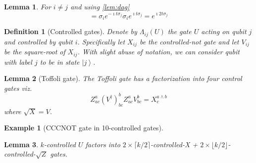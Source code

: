 \documentclass[12pt]{article}
\newcommand{\ket}[1]{\ensuremath{\left| #1 \right \rangle}}
\newcommand{\1}[1]{\mathds{1}\left[#1\right]}
\newtheorem{definition}{Definition}
\newtheorem{lemma}{Lemma}
\newtheorem{example}{Example}
\begin{document}
\begin{lemma}
For $i\neq j$ and using \ref{lem:dag} 
\begin{equation}
    [\sigma_i, e^{-\imath t \sigma_j}] = \sigma_i e^{-\imath t \sigma_j}\sigma_i e^{\imath t \sigma_j} = e^{\imath 2 t \sigma_j}
\end{equation}
\end{lemma}

\begin{definition}[Controlled gates]
Denote by $\Lambda_{ij}(U)$ the gate $U$ acting on qubit $j$ and controlled by qubit $i$.  Specifically let $X_{ij}$ be the controlled-not gate and let $V_{ij}$ be the square-root of $X_{ij}$. With  slight abuse of notation, we can consider qubit with label $j$ to be in state $\ket{j}$. 
\end{definition}

\begin{lemma}[Toffoli gate]
The Toffoli gate has a factorization into four control gates viz. 
\begin{equation}
    Z^a_{ac}(V^\dagger)^b_{bc}Z^a_{ac}V^b_{bc}=X_c^{a\wedge b}
\end{equation}
where $\sqrt{X}= V$. 
\end{lemma}

\begin{example}[CCCNOT gate in 10-controlled gates]

\end{example}

\begin{lemma} $k$-controlled $U$ factors into $2\times \lceil k/2 \rceil$-controlled-X + $2\times \lfloor k/2 \rfloor$-controlled-$\sqrt{Z}$ gates.

\end{lemma}
\end{document}
